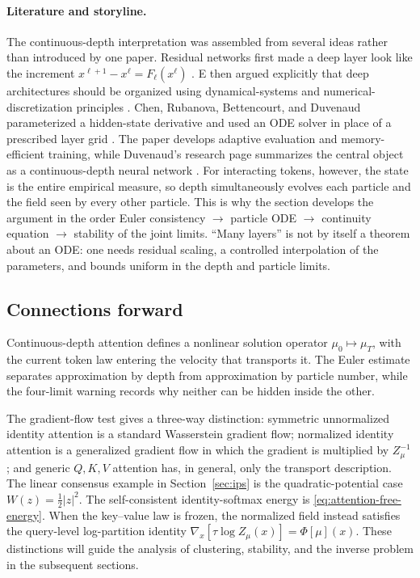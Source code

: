 \documentclass[11pt]{amsart}
\numberwithin{equation}{section}
\theoremstyle{plain}
\newcommand{\abs}[1]{\left\lvert#1\right\rvert}
\begin{document}
\paragraph{\textbf{Literature and storyline.}}
The continuous-depth interpretation was assembled from several ideas rather
than introduced by one paper.  Residual networks first made a deep layer look
like the increment $x^{\ell+1}-x^\ell=F_\ell(x^\ell)$
\cite{HeEtAl2016ResNet}.  E then argued explicitly that deep architectures
should be organized using dynamical-systems and numerical-discretization
principles \cite{E2017DynamicalSystems}.  Chen, Rubanova, Bettencourt, and
Duvenaud parameterized a hidden-state derivative and used an ODE solver in
place of a prescribed layer grid \cite{ChenEtAl2018NeuralODE}.  The paper
develops adaptive evaluation and memory-efficient training, while Duvenaud's
research page summarizes the central object as a continuous-depth neural
network \cite{DuvenaudResearchProfile}.  For interacting tokens, however, the state is
the entire empirical measure, so depth simultaneously evolves each particle
and the field seen by every other particle.  This is why the section develops
the argument in the order Euler consistency $\to$ particle ODE $\to$
continuity equation $\to$ stability of the joint limits.  ``Many layers'' is
not by itself a theorem about an ODE: one needs residual scaling, a controlled
interpolation of the parameters, and bounds uniform in the depth and particle
limits.


\subsection{Connections forward}
Continuous-depth attention defines a nonlinear solution operator
$\mu_0\mapsto\mu_T$, with the current token law entering the velocity that
transports it.  The Euler estimate separates approximation by depth from
approximation by particle number, while the four-limit warning records why
neither can be hidden inside the other.

The gradient-flow test gives a three-way distinction: symmetric unnormalized identity attention is a standard
Wasserstein gradient flow; normalized identity attention is a generalized
gradient flow in which the gradient is multiplied by $Z_\mu^{-1}$; and
generic $Q,K,V$ attention has, in
general, only the transport description.  The linear consensus example in
Section~\ref{sec:ips} is the quadratic-potential case
$W(z)=\frac12\abs z^2$.  The self-consistent identity-softmax energy is
\eqref{eq:attention-free-energy}. When the key--value law is frozen,
the normalized field instead satisfies the query-level log-partition identity
$\nabla_x[\tau\log Z_\mu(x)]=\Phi[\mu](x)$. These distinctions will guide
the analysis of clustering, stability, and the inverse problem in the
subsequent sections.
\end{document}
